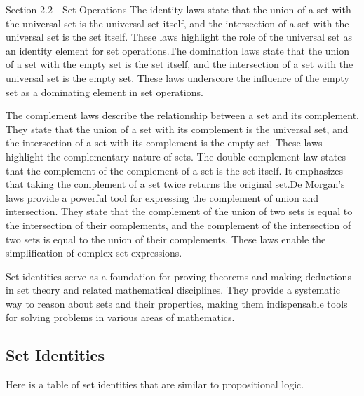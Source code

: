 \begin{notes}{Section 2.2 - Set Operations}
    The identity laws state that the union of a set with the universal set is the universal set itself, and the intersection of a set with the universal set is the set itself. These laws highlight the role 
    of the universal set as an identity element for set operations.The domination laws state that the union of a set with the empty set is the set itself, and the intersection of a set with the universal set 
    is the empty set. These laws underscore the influence of the empty set as a dominating element in set operations.
    
    The complement laws describe the relationship between a set and its complement. They state that the union of a set with its complement is the universal set, and the intersection of a set with its complement 
    is the empty set. These laws highlight the complementary nature of sets. The double complement law states that the complement of the complement of a set is the set itself. It emphasizes that taking the 
    complement of a set twice returns the original set.De Morgan's laws provide a powerful tool for expressing the complement of union and intersection. They state that the complement of the union of two sets 
    is equal to the intersection of their complements, and the complement of the intersection of two sets is equal to the union of their complements. These laws enable the simplification of complex set expressions.
    
    Set identities serve as a foundation for proving theorems and making deductions in set theory and related mathematical disciplines. They provide a systematic way to reason about sets and their properties, 
    making them indispensable tools for solving problems in various areas of mathematics.

    \subsection*{Set Identities}

    Here is a table of set identities that are similar to propositional logic.


\end{notes}
